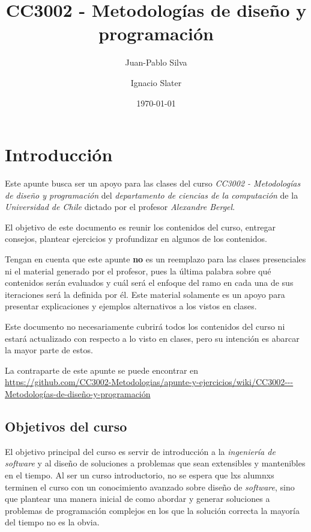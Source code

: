 \documentclass[12pt]{book}
\title{CC3002 - Metodologías de diseño y programación}
\author{Juan-Pablo Silva}
\author{Ignacio Slater}
\affil{Departamento de Ciencias de la Computación, Universidad de Chile}
\date{\today}
\begin{document}
  \frontmatter
  \maketitle
  \tableofcontents
  \chapter{Introducción}
    Este apunte busca ser un apoyo para las clases del curso \textit{CC3002 - Metodologías 
    de diseño y programación} del \textit{departamento de ciencias de la computación} de
    la \textit{Universidad de Chile} dictado por el profesor \textit{Alexandre Bergel}.

    El objetivo de este documento es reunir los contenidos del curso, entregar consejos,
    plantear ejercicios y profundizar en algunos de los contenidos.

    Tengan en cuenta que este apunte \textbf{no} es un reemplazo para las clases 
    presenciales ni el material generado por el profesor, pues la última palabra sobre qué 
    contenidos serán evaluados y cuál será el enfoque del ramo en cada una de sus 
    iteraciones será la definida por él.
    Este material solamente es un apoyo para presentar explicaciones y ejemplos 
    alternativos a los vistos en clases.

    Este documento no necesariamente cubrirá todos los contenidos del curso ni estará 
    actualizado con respecto a lo visto en clases, pero su intención es abarcar la mayor
    parte de estos.

    La contraparte de este apunte se puede encontrar en 
    \url{https://github.com/CC3002-Metodologias/apunte-y-ejercicios/wiki/CC3002---Metodologías-de-diseño-y-programación}

    \section*{Objetivos del curso}
      El objetivo principal del curso es servir de introducción a la \textit{ingeniería de
      software} y al diseño de soluciones a problemas que sean extensibles y mantenibles
      en el tiempo.
      Al ser un curso introductorio, no se espera que lxs alumnxs terminen el curso con un
      conocimiento avanzado sobre diseño de \textit{software}, sino que plantear una 
      manera inicial de como abordar y generar soluciones a problemas de programación
      complejos en los que la solución correcta la mayoría del tiempo no es la obvia.
\end{document}
